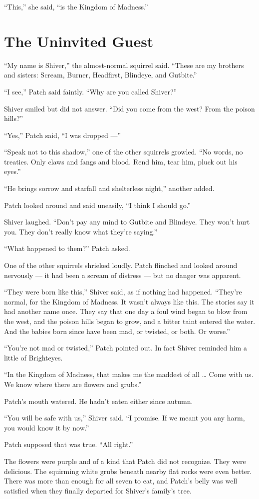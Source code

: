 \documentclass[ebook,oneside,openany,17pt]{memoir}
\renewcommand{\thechapter}{\Roman{chapter}}
\newcounter{sections}
\newcommand{\sections}[1]{%
  \section*{#1}
  \addtocounter{sections}{1}%
  \pdfbookmark[1]{#1}{section.\thechapter.\thesections}}
\begin{document}
“This,” she said, “is the Kingdom of Madness.”


\sections{The Uninvited Guest}

“My name is Shiver,” the almost-normal squirrel said. “These are my
brothers and sisters: Scream, Burner, Headfirst, Blindeye, and
Gutbite.”

“I see,” Patch said faintly. “Why are you called Shiver?”

Shiver smiled but did not answer. “Did you come from the west? From
the poison hills?”

“Yes,” Patch said, “I was dropped —”

“Speak not to this shadow,” one of the other squirrels growled. “No
words, no treaties. Only claws and fangs and blood. Rend him, tear
him, pluck out his eyes.”

“He brings sorrow and starfall and shelterless night,” another added.

Patch looked around and said uneasily, “I think I should go.”

Shiver laughed. “Don’t pay any mind to Gutbite and Blindeye. They
won’t hurt you. They don’t really know what they’re saying.”

“What happened to them?” Patch asked.

One of the other squirrels shrieked loudly. Patch flinched and looked
around nervously — it had been a scream of distress — but no danger
was apparent.

“They were born like this,” Shiver said, as if nothing had
happened. “They’re normal, for the Kingdom of Madness. It wasn’t
always like this. The stories say it had another name once. They say
that one day a foul wind began to blow from the west, and the poison
hills began to grow, and a bitter taint entered the water. And the
babies born since have been mad, or twisted, or both. Or worse.”

“You’re not mad or twisted,” Patch pointed out. In fact Shiver
reminded him a little of Brighteyes.

“In the Kingdom of Madness, that makes me the maddest of all … Come
with us. We know where there are flowers and grubs.”

Patch’s mouth watered. He hadn’t eaten either since autumn.

“You will be safe with us,” Shiver said. “I promise. If we meant you
any harm, you would know it by now.”

Patch supposed that was true. “All right.”

The flowers were purple and of a kind that Patch did not
recognize. They were delicious. The squirming white grubs beneath
nearby flat rocks were even better. There was more than enough for all
seven to eat, and Patch’s belly was well satisfied when they finally
departed for Shiver’s family’s tree.
\end{document}

